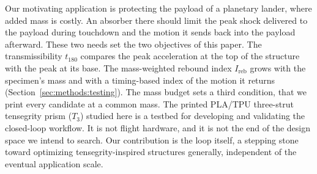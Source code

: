 \documentclass[11pt]{article}
\begin{document}
Our motivating application is protecting the payload of a planetary
lander, where added mass is costly. An absorber there should limit the
peak shock delivered to the payload during touchdown and the motion it
sends back into the payload afterward. These two needs set the two
objectives of this paper. The transmissibility $t_{180}$ compares the
peak acceleration at the top of the structure with the peak at its
base. The mass-weighted rebound index $I_{\mathrm{reb}}$ grows with the
specimen's mass and with a timing-based index of the motion it returns
(Section~\ref{sec:methods:testing}). The mass budget sets a third
condition, that we print every candidate at a common mass. The
printed PLA/TPU three-strut tensegrity prism ($T_3$) studied here is a testbed for developing
and validating the closed-loop workflow. It is not flight hardware, and
it is not the end of the design space we intend to search. Our
contribution is the loop itself, a stepping stone toward optimizing
tensegrity-inspired structures generally, independent of the eventual
application scale.
\end{document}
